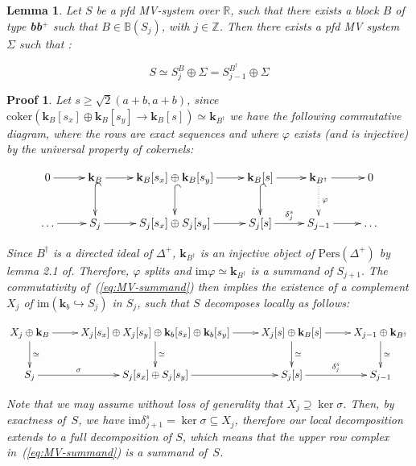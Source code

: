 \documentclass[a4paper, english, 11pt]{article}
\newcommand{\kk}[0]{\textbf{k}}
\newcommand{\Pe}{\text{Pers}}
\newcommand{\0}{\vec{0}}
\newcommand{\R}[0]{\mathbb{R}}
\newcommand{\Z}[0]{\mathbb{Z}}
\newtheorem*{pf}{Proof} }
\newtheorem{lem}[prop]{Lemma}
\begin{document}
\begin{lem}
Let $S$ be a pfd MV-system over $\R$, such that there exists  a block $B$ of type \textbf{bb$^+$} such that $B\in\mathbb{B}(S_{j})$, with $j\in\Z$. Then there exists a pfd MV system $\Sigma$ such that : 

$$ S \simeq S_{j}^{B} \oplus \Sigma = S_{j-1}^{B^\dag} \oplus \Sigma  $$
\end{lem}

\begin{pf}
Let $s \geq \sqrt{2}(a+b,a+b)$, since $\text{coker}\left (\kk_B[s_x] \oplus \kk_B[s_y] \longrightarrow \kk_B[s] \right ) \simeq \kk_{B^\dag} $  we have the following commutative diagram, where the rows are exact sequences and where $\varphi$ exists (and is injective) by the universal property of cokernels: 
 
 \begin{equation}\label{eq:MV-summand}
 \begin{gathered}
 \xymatrix{0 \ar[r] & \kk_B \ar@{^{(}->}[d] \ar[r] &\kk_B[s_x] \oplus \kk_B[s_y] \ar[r] \ar@{^{(}->}[d] & \kk_B[s]\ar[r] \ar@{^{(}->}[d] & \kk_{B^\dag} \ar[r] \ar@{.>}[d]^\varphi  & 0 \\
\dots \ar[r] & S_j \ar[r] & S_j[s_x] \oplus S_j[s_y] \ar[r] & S_j[s] \ar[r]^{\delta_j^s} & S_{j-1} \ar[r]& \dots  }
\end{gathered}
\end{equation}
 
Since $B^\dag$ is a directed ideal of $\Delta^+$, $\kk_{B^\dag}$ is an injective object of $\Pe(\Delta^+)$ by lemma 2.1 of\cite{BotCra18}. Therefore, $\varphi$ splits and $\text{im} \varphi \simeq \kk_{B^\dag}$ is a summand of $S_{j+1}$.  The commutativity of~(\ref{eq:MV-summand}) then implies the existence of a complement $X_j$ of $\text{im} (\kk_b\hookrightarrow S_j)$ in $S_j$, such that $S$ decomposes locally as follows:

$$
\xymatrix{X_j \oplus \kk_B \ar^-{\simeq}[d]\ar[r] &X_j[s_x] \oplus X_j[s_y] \oplus  \kk_b[s_x] \oplus \kk_b[s_y] \ar^-{\simeq}[d]\ar[r] & X_j[s] \oplus \kk_B[s] \ar^-{\simeq}[d] \ar[r]  & X_{j-1} \oplus \kk_{B^\dag} \ar^-{\simeq}[d]\\
S_j \ar^-{\sigma}[r] & S_j[s_x] \oplus S_j[s_y] \ar[r] & S_j[s] \ar[r]^{\delta_j^s} & S_{j-1}
}$$

Note that we may assume without loss of generality that $X_j \supseteq \ker \sigma$.
Then, by exactness of~$S$, we have $\text{im} \delta_{j+1}^s = \ker \sigma\subseteq X_j$, therefore our local decomposition extends to a full decomposition of $S$, which means that the upper row complex in~(\ref{eq:MV-summand}) is a summand of~$S$.
\end{pf}
\end{document}

